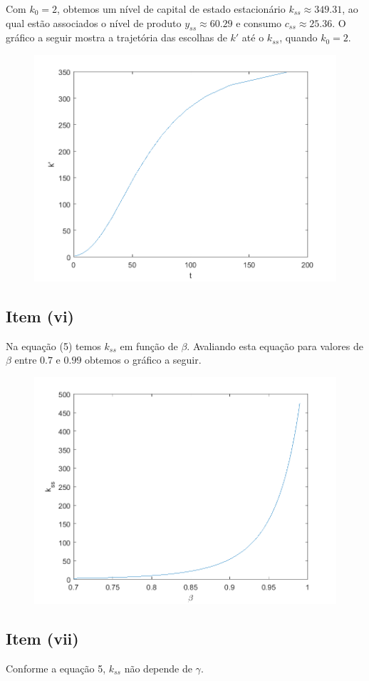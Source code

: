 \documentclass{article}
\begin{document}
Com $k_0 = 2$, obtemos um nível de capital de estado estacionário $k_{ss} \approx 349.31$, 
ao qual estão associados o nível de produto $y_{ss} \approx 60.29$ e consumo $c_{ss} \approx 25.36$.
O gráfico a seguir mostra a trajetória das escolhas de $k'$ até o $k_{ss}$, quando $k_0 = 2$.

\begin{figure}[!h]
  \includegraphics{ex2_2.png}
\end{figure}

\subsection*{Item (vi)}

Na equação (5) temos $k_{ss}$ em função de $\beta$. Avaliando esta equação para valores
de $\beta$ entre $0.7$ e $0.99$ obtemos o gráfico a seguir.

\begin{figure}[!h]
  \includegraphics{ex2_3.png}
\end{figure}

\newpage

\subsection*{Item (vii)}

Conforme a equação 5, $k_{ss}$ não depende de $\gamma$.
\end{document}

